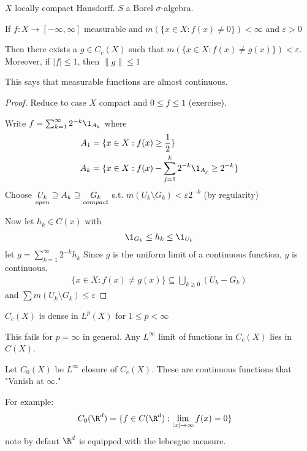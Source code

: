 $X$ locally compact Hausdorff. $S$ a Borel $\sigma$-algebra.


 \begin{theorem}[Lusin]
	 If $f: X \to [-\infty, \infty]$  measurable and $m(\{x \in X : f(x) \neq 0 \} ) < \infty$ and  $\varepsilon > 0$

	 Then there exists a $g \in C_{c} (X) $ such that $m( \{ x \in X : f(x) \neq g(x) \} ) < \varepsilon$.
	 Moreover, if $|f| \leq 1$, then $ \|g\| \leq 1$
 \end{theorem}

 \begin{remark}
 	This says that measurable functions are almost continuous.
 \end{remark}

\begin{proof}
	Reduce to case $X$ compact and $0 \leq f \leq 1$ (exercise).

	Write $f = \sum_{k=1}^{\infty} 2^{-k} \1_{A_{k}}$ where
	\begin{align*}
		A_{1} &= \{ x \in X : f(x) \geq \frac{1}{2} \} \\
		A_{k} &= \{ x \in X : f(x) - \sum_{j=1}^{k} 2^{-k} \1_{A_{j}} \geq 2^{-k} \}
	\end{align*}
	Choose $\underset{open}{U_{k}} \supseteq A_{k} \supseteq \underset{compact}{G_{k}}$
	s.t. $m(U_{k} \setminus G_{k}) < \varepsilon 2^{-k}$ (by regularity)

	Now let $h_{k} \in C (x)$ with
	\begin{align*}
		\1_{G_{k}} \leq h_{k} \leq \1_{U_{k}}
	\end{align*}
	let $g = \sum_{k=1}^{\infty} 2^{-k}h_{k}$
	Since $g$ is the uniform limit of a continuous function, $g$ is continuous.
	\begin{align*}
		\{ x \in X : f(x) \neq g(x) \} \subseteq \bigcup_{k \geq 0} ( U_{k} - G_{k} )
	\end{align*} and
	$\sum m( U_{k} \setminus G_{k} ) \leq \varepsilon$
\end{proof}

\begin{corollary}
	$C_c (X)$ is dense in $L^{p} (X)$ for $1 \leq p < \infty$
\end{corollary}

\begin{remark}
	This fails for $p = \infty$ in general.
	Any $L^{\infty}$ limit of functions in $C_c (X)$ lies in $C (X)$.
\end{remark}

Let $C_{0} (X)$ be $L^{\infty}$ closure of $C_c (X)$. These are continuous functions that "Vanish at $\infty$."

For example:
\begin{align*}
	C_{0} (\R^d ) &= \{ f\in C (\R^{d}) : \lim_{|x| \to \infty } f(x) = 0 \}
\end{align*} note by defaut $\R^{d}$ is equipped with the lebesgue measure.
